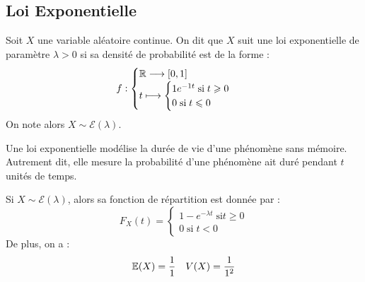 \subsection{Loi Exponentielle}

\begin{definition}
    Soit $X$ une variable aléatoire continue. On dit que $X$ suit une loi exponentielle de paramètre $ \lambda > 0$ 
    si sa densité de probabilité est de la forme : 
        \[ f : 
            \begin{cases}
                \mathbb{R} \longrightarrow [0,1] \\ 
                t \longmapsto 
                    \begin{cases}
                        1 e^{-1 t} \; \text{si} \; t \geqslant 0 \\ 
                        0 \; \text{si} \; t \leqslant 0 
                    \end{cases}
            \end{cases} \] 
    On note alors $X \sim \mathcal{E}(\lambda)$. 
\end{definition}

Une loi exponentielle modélise la durée de vie d'une phénomène sans mémoire. Autrement dit, elle mesure la probabilité 
d'une phénomène ait duré pendant $t$ unités de temps. 

\begin{proposition}
    Si $X \sim \mathcal{E}(\lambda)$, alors sa fonction de répartition est donnée par : 
        \[ F_X(t) = 
            \begin{cases}
                1 - e ^{- \lambda t } \; \text{si} t \geqslant 0 \\ 
                0 \; \text{si} \; t < 0 
            \end{cases} \] 
    De plus, on a : 
        \[ \mathbb{E}(X) = \frac{1}{1} \quad V(X) = \frac{1}{1^2} \] 
\end{proposition}

